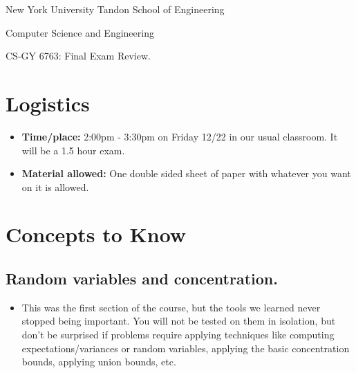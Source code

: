 \documentclass[10pt]{article}
\begin{document}
	
\begin{center}
	\normalsize
	New York University Tandon School of Engineering
	
	Computer Science and Engineering
	\medskip
	
	\large
	CS-GY 6763: Final Exam Review. 
	\medskip
\end{center} 

\section{Logistics}
\begin{itemize}
	\item \textbf{Time/place:} 2:00pm - 3:30pm on Friday 12/22 in our usual classroom. It will be a 1.5 hour exam. 
	\item \textbf{Material allowed:}  One double sided sheet of paper with whatever you want on it is allowed. 
\end{itemize}

\section{Concepts to Know}

\subsection{Random variables and concentration.}
\begin{itemize}
	\item This was the first section of the course, but the tools we learned never stopped being important. You will not be tested on them in isolation, but don't be surprised if problems require applying techniques like computing expectations/variances or random variables, applying the basic concentration bounds, applying union bounds, etc.  
\end{itemize}
\end{document}
